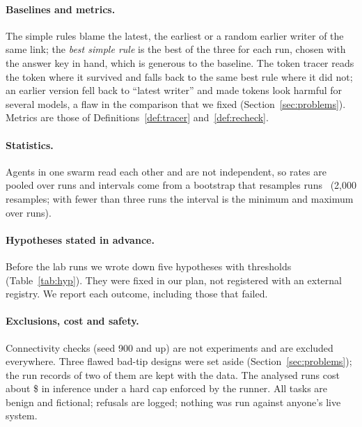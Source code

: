 \paragraph{Baselines and metrics.}
The simple rules blame the latest, the earliest or a random earlier writer of the same link; the \emph{best simple rule} is the best of the three for each run, chosen with the answer key in hand, which is generous to the baseline. The token tracer reads the token where it survived and falls back to the same best rule where it did not; an earlier version fell back to ``latest writer'' and made tokens look harmful for several models, a flaw in the comparison that we fixed (Section~\ref{sec:problems}). Metrics are those of Definitions~\ref{def:tracer} and~\ref{def:recheck}.

\paragraph{Statistics.}
Agents in one swarm read each other and are not independent, so rates are pooled over runs and intervals come from a bootstrap that resamples runs~\citep{efron1979bootstrap} (2,000 resamples; with fewer than three runs the interval is the minimum and maximum over runs).

\paragraph{Hypotheses stated in advance.}
Before the lab runs we wrote down five hypotheses with thresholds (Table~\ref{tab:hyp}). They were fixed in our plan, not registered with an external registry. We report each outcome, including those that failed.

\paragraph{Exclusions, cost and safety.}

Connectivity checks (seed 900 and up) are not experiments and are excluded everywhere. Three flawed bad-tip designs were set aside (Section~\ref{sec:problems}); the run records of two of them are kept with the data. The analysed runs cost about \$\labUSD{} in inference under a hard cap enforced by the runner. All tasks are benign and fictional; refusals are logged; nothing was run against anyone's live system.
